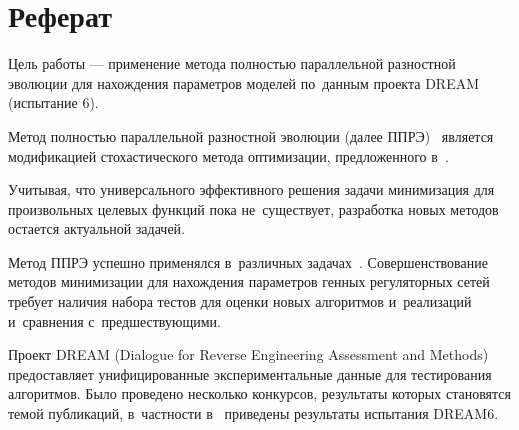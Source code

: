 \chapter*{Реферат}							%

Цель работы — применение метода полностью параллельной разностной эволюции для 
нахождения параметров моделей по~данным проекта DREAM (испытание 6).

Метод полностью параллельной разностной эволюции (далее ППРЭ)~\cite{bib2,bib5} 
является модификацией стохастического метода оптимизации, предложенного 
в~\cite{bib1}. 

Учитывая, что универсального эффективного решения задачи минимизация для 
произвольных целевых функций пока не~существует, разработка новых методов 
остается актуальной задачей. 

Метод ППРЭ успешно применялся в~различных задачах~\cite{bib3,bib4}.
Совершенствование методов минимизации для нахождения параметров генных 
регуляторных сетей требует наличия набора тестов для оценки новых алгоритмов 
и~реализаций и~сравнения с~предшествующими. 

Проект DREAM (Dialogue for Reverse Engineering Assessment and Methods) 
предоставляет унифицированные экспериментальные данные для тестирования 
алгоритмов. Было проведено несколько конкурсов, результаты которых становятся 
темой публикаций, в~частности в~\cite{bib6} приведены результаты испытания 
DREAM6.

\clearpage
